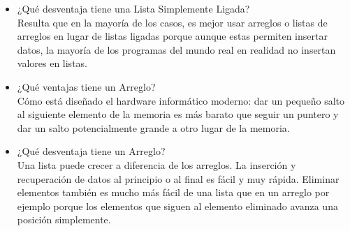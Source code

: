 \documentclass{article}
\begin{document}
\begin{itemize}
    \item ¿Qué desventaja tiene una Lista Simplemente Ligada?\\
    Resulta que en la mayoría de los casos, es mejor usar arreglos o listas de arreglos en lugar de listas ligadas porque aunque estas permiten insertar datos, la mayoría de los programas del mundo real en realidad no insertan valores en listas.\\
    
    \item ¿Qué ventajas tiene un Arreglo?\\
    Cómo está diseñado el hardware informático moderno: dar un pequeño salto al siguiente elemento de la memoria es más barato que seguir un puntero y dar un salto potencialmente grande a otro lugar de la memoria.
    
    \item ¿Qué desventaja tiene un Arreglo?\\
     Una lista puede crecer a diferencia de los arreglos. La inserción y recuperación de datos al principio o al final es fácil y muy rápida. Eliminar elementos también es mucho más fácil de una lista que en un arreglo por ejemplo porque los elementos que siguen al elemento eliminado avanza una posición simplemente.\\
\end{itemize}
\end{document}
